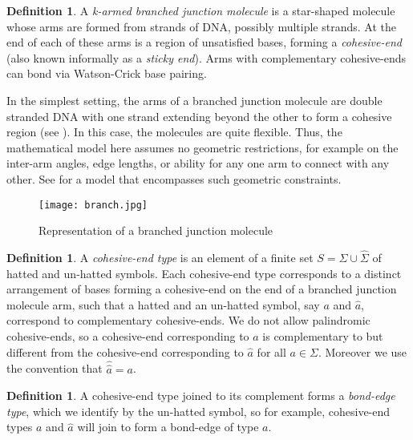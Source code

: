 \documentclass{elsarticle}
\theoremstyle{definition}
\newtheorem{definition}[theorem]{Definition}
\theoremstyle{remark}
\theoremstyle{plain}
\theoremstyle{plain}
\begin{document}
\begin{definition} A \emph{k-armed branched junction molecule} is a star-shaped molecule whose arms are formed from strands of DNA, possibly multiple strands.  At the end of each of these arms is a region of unsatisfied bases, forming a \emph{cohesive-end} (also known informally as a \emph{sticky end}).  Arms with complementary cohesive-ends can bond via Watson-Crick base pairing. \end{definition}

In the simplest setting, the arms of a branched junction molecule are double stranded DNA with one strand extending beyond the other to form a cohesive region (see \cite{SK94}).  In this case, the molecules are quite flexible.  Thus, the mathematical model here assumes no geometric restrictions, for example on the inter-arm angles, edge lengths, or ability for any one arm to connect with any other.  See \cite{ferrari2018} for a model that encompasses such geometric constraints.

  \begin{figure} \centering \texttt{[image: branch.jpg]} \caption{Representation of a branched junction molecule} \end{figure}   


\begin{definition}
A \emph{cohesive-end type} is an element of a finite set $S = \Sigma \cup \hat{\Sigma} $ of hatted and un-hatted symbols.  Each cohesive-end type corresponds to a distinct arrangement of bases forming a cohesive-end on the end of a branched junction molecule arm, such that a hatted and an un-hatted symbol, say $a$ and $\hat{a}$, correspond to complementary cohesive-ends.  We do not allow palindromic cohesive-ends,  so a cohesive-end corresponding to 
 $a$ is complementary to but different from the cohesive-end corresponding to $\hat{a}$ for all $a\in \Sigma$. Moreover we use the convention that $\hat{\hat a} =a$. 

\end{definition}

\begin{definition}
A cohesive-end type joined to its complement forms a \emph{bond-edge type}, which we identify by the un-hatted symbol, so for example, cohesive-end types $a$ and $\hat{a}$ will join to form a bond-edge of type $a$.
\end{definition}
\end{document}
